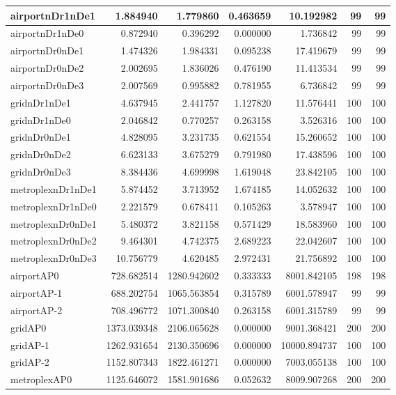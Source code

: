 \begin{longtable}{|l|r|r|r|r|r|r|}
\endlastfoot
airportnDr1nDe1 & 1.884940 & 1.779860 & 0.463659 & 10.192982 & 99 & 99 \\ \hline
airportnDr1nDe0 & 0.872940 & 0.396292 & 0.000000 & 1.736842 & 99 & 99 \\ \hline
airportnDr0nDe1 & 1.474326 & 1.984331 & 0.095238 & 17.419679 & 99 & 99 \\ \hline
airportnDr0nDe2 & 2.002695 & 1.836026 & 0.476190 & 11.413534 & 99 & 99 \\ \hline
airportnDr0nDe3 & 2.007569 & 0.995882 & 0.781955 & 6.736842 & 99 & 99 \\ \hline
gridnDr1nDe1 & 4.637945 & 2.441757 & 1.127820 & 11.576441 & 100 & 100 \\ \hline
gridnDr1nDe0 & 2.046842 & 0.770257 & 0.263158 & 3.526316 & 100 & 100 \\ \hline
gridnDr0nDe1 & 4.828095 & 3.231735 & 0.621554 & 15.260652 & 100 & 100 \\ \hline
gridnDr0nDe2 & 6.623133 & 3.675279 & 0.791980 & 17.438596 & 100 & 100 \\ \hline
gridnDr0nDe3 & 8.384436 & 4.699998 & 1.619048 & 23.842105 & 100 & 100 \\ \hline
metroplexnDr1nDe1 & 5.874452 & 3.713952 & 1.674185 & 14.052632 & 100 & 100 \\ \hline
metroplexnDr1nDe0 & 2.221579 & 0.678411 & 0.105263 & 3.578947 & 100 & 100 \\ \hline
metroplexnDr0nDe1 & 5.480372 & 3.821158 & 0.571429 & 18.583960 & 100 & 100 \\ \hline
metroplexnDr0nDe2 & 9.464301 & 4.742375 & 2.689223 & 22.042607 & 100 & 100 \\ \hline
metroplexnDr0nDe3 & 10.756779 & 4.620485 & 2.972431 & 21.756892 & 100 & 100 \\ \hline
airportAP0 & 728.682514 & 1280.942602 & 0.333333 & 8001.842105 & 198 & 198 \\ \hline
airportAP-1 & 688.202754 & 1065.563854 & 0.315789 & 6001.578947 & 99 & 99 \\ \hline
airportAP-2 & 708.496772 & 1071.300840 & 0.263158 & 6001.315789 & 99 & 99 \\ \hline
gridAP0 & 1373.039348 & 2106.065628 & 0.000000 & 9001.368421 & 200 & 200 \\ \hline
gridAP-1 & 1262.931654 & 2130.350696 & 0.000000 & 10000.894737 & 100 & 100 \\ \hline
gridAP-2 & 1152.807343 & 1822.461271 & 0.000000 & 7003.055138 & 100 & 100 \\ \hline
metroplexAP0 & 1125.646072 & 1581.901686 & 0.052632 & 8009.907268 & 200 & 200 \\ \hline

\end{longtable}
